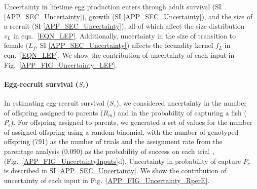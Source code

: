 \documentclass[12pt, oneside]{article}   	%
\begin{document}
Uncertainty in lifetime egg production enters through adult survival (SI \ref{APP_SEC_Uncertainty}), growth (SI \ref{APP_SEC_Uncertainty}), and the size of a recruit (SI \ref{APP_SEC_Uncertainty}), all of which affect the size distribution $v_L$ in eqn.\ \ref{EQN_LEP}. Additionally, uncertainty in the size of transition to female ($L_f$, SI \ref{APP_SEC_Uncertainty}) affects the fecundity kernel $f_L$ in eqn.\ \ref{EQN_LEP}. We show the contribution of uncertainty of each input in Fig.\ \ref{APP_FIG_Uncertainty_LEP}.

\paragraph*{Egg-recruit survival ($S_e$)} %

In estimating egg-recruit survival ($S_e$), we considered uncertainty in the number of offspring assigned to parents ($R_m$) and in the probability of capturing a fish ($P_c$). For offspring assigned to parents, we generated a set of values for the number of assigned offspring using a random binomial, with the number of genotyped offspring (791) as the number of trials and the assignment rate from the parentage analysis (0.090) as the probability of success on each trial \citep{catalanoInPrepconnectivity}, (Fig.\ \ref{APP_FIG_UncertaintyInputs}d). Uncertainty in probability of capture $P_c$ is described in SI \ref{APP_SEC_Uncertainty}. We show the contribution of uncertainty of each input in Fig.\ \ref{APP_FIG_Uncertainty_RperE}.



\end{document}

